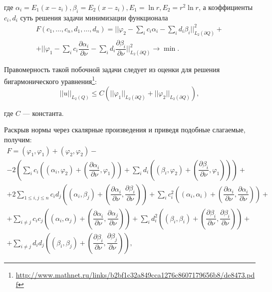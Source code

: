 \documentclass[a4paper]{article}
\begin{document}
где $\alpha_i=E_1(x-z_i), \beta_i = E_2(x-z_i), E_1=\ln r, E_2= r^2 \ln r$, а коэффициенты $c_i, d_i$ суть решения задачи минимизации функционала
\begin{multline*}
  F(c_1,\dots,c_n,d_1,\dots,d_n)= \biggl|\biggl|\varphi_2 -\sum_i c_i \alpha_i-\sum_i d_i \beta_i   \biggl|\biggl|_{L_2(\partial Q)}^2+\\
  +\biggl|\biggl|\varphi_1 -\sum_i c_i \dfrac{\partial \alpha_i}{\partial \nu} -\sum_i d_i \dfrac{\partial \beta_i }{\partial \nu}   \biggl|\biggl|_{L_2(\partial Q)}^2 \rightarrow \min .
\end{multline*}

Правомерность такой побочной задачи следует из оценки для решения бигармонического уравнения\footnote{\url{http://www.mathnet.ru/links/b2bf1c32a849cca1276c8607179656b8/de8473.pdf}}:
\begin{equation*}
  ||u||_{L_2(Q)} \leq C \left(||\varphi_1||_{L_2(\partial Q)}+ ||\varphi_2||_{L_2(\partial Q)} \right),
\end{equation*}

где $C$ --- константа.

Раскрыв нормы через скалярные произведения и приведя подобные слагаемые, получим:
\begin{multline}
  F=(\varphi_1,\varphi_1)+(\varphi_2,\varphi_2) - \\
  -2 \left(\sum_i c_i \left((\alpha_i,\varphi_2)+\left(\dfrac{\partial \alpha_i}{\partial \nu},\varphi_1\right)  \right)+\sum_i d_i \left((\beta_i,\varphi_2)+\left(\dfrac{\partial \beta_i}{\partial \nu},\varphi_1\right)  \right) \right)+\\
  +2\sum_{1 \leq i,j \leq n} c_i d_j \left((\alpha_i,\beta_j)+\left(\dfrac{\partial \alpha_i}{\partial \nu},\dfrac{\partial \beta_i}{\partial \nu}\right)  \right)+
  \sum_i c_i^2 \left(  (\alpha_i,\alpha_i)+\left(\dfrac{\partial \alpha_i}{\partial \nu},\dfrac{\partial \alpha_i}{\partial \nu}\right)  \right)+\\
  +\sum_{i \ne j} c_i c_j \left(  (\alpha_i,\alpha_j)+\left(\dfrac{\partial \alpha_i}{\partial \nu},\dfrac{\partial \alpha_j}{\partial \nu}\right)\right)+
  \sum_i d_i^2 \left(  (\beta_i,\beta_i)+\left(\dfrac{\partial \beta_i}{\partial \nu},\dfrac{\partial \beta_i}{\partial \nu}\right)  \right)+\\
  +\sum_{i \ne j} d_i d_j \left(  (\beta_i,\beta_j)+\left(\dfrac{\partial \beta_i}{\partial \nu},\dfrac{\partial \beta_j}{\partial \nu}\right)\right),
  \label{func}
\end{multline}
\end{document}
